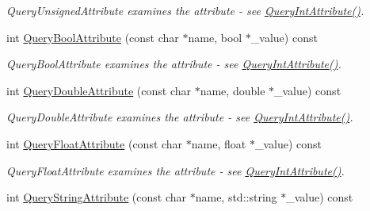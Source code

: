 \begin{DoxyCompactItemize}
\begin{DoxyCompactList}\small\item\em Query\+Unsigned\+Attribute examines the attribute -\/ see \hyperlink{class_ti_xml_element_aea0bfe471380f281c5945770ddbf52b9}{Query\+Int\+Attribute()}. \end{DoxyCompactList}\item 
int \hyperlink{class_ti_xml_element_af4a1d3f88c28eb0f3115dc39ebd83fff}{Query\+Bool\+Attribute} (const char $\ast$name, bool $\ast$\+\_\+value) const 
\begin{DoxyCompactList}\small\item\em Query\+Bool\+Attribute examines the attribute -\/ see \hyperlink{class_ti_xml_element_aea0bfe471380f281c5945770ddbf52b9}{Query\+Int\+Attribute()}. \end{DoxyCompactList}\item 
int \hyperlink{class_ti_xml_element_a898d7730ecc341f0bffc7a9dadbf1ce7}{Query\+Double\+Attribute} (const char $\ast$name, double $\ast$\+\_\+value) const \hypertarget{class_ti_xml_element_a898d7730ecc341f0bffc7a9dadbf1ce7}{}\label{class_ti_xml_element_a898d7730ecc341f0bffc7a9dadbf1ce7}

\begin{DoxyCompactList}\small\item\em Query\+Double\+Attribute examines the attribute -\/ see \hyperlink{class_ti_xml_element_aea0bfe471380f281c5945770ddbf52b9}{Query\+Int\+Attribute()}. \end{DoxyCompactList}\item 
int \hyperlink{class_ti_xml_element_aa04d3af11601ef5a5f88295203a843be}{Query\+Float\+Attribute} (const char $\ast$name, float $\ast$\+\_\+value) const \hypertarget{class_ti_xml_element_aa04d3af11601ef5a5f88295203a843be}{}\label{class_ti_xml_element_aa04d3af11601ef5a5f88295203a843be}

\begin{DoxyCompactList}\small\item\em Query\+Float\+Attribute examines the attribute -\/ see \hyperlink{class_ti_xml_element_aea0bfe471380f281c5945770ddbf52b9}{Query\+Int\+Attribute()}. \end{DoxyCompactList}\item 
int \hyperlink{class_ti_xml_element_a14321ac360efe906ed449d9db3fd9961}{Query\+String\+Attribute} (const char $\ast$name, std\+::string $\ast$\+\_\+value) const \hypertarget{class_ti_xml_element_a14321ac360efe906ed449d9db3fd9961}{}\label{class_ti_xml_element_a14321ac360efe906ed449d9db3fd9961}


\end{DoxyCompactItemize}
